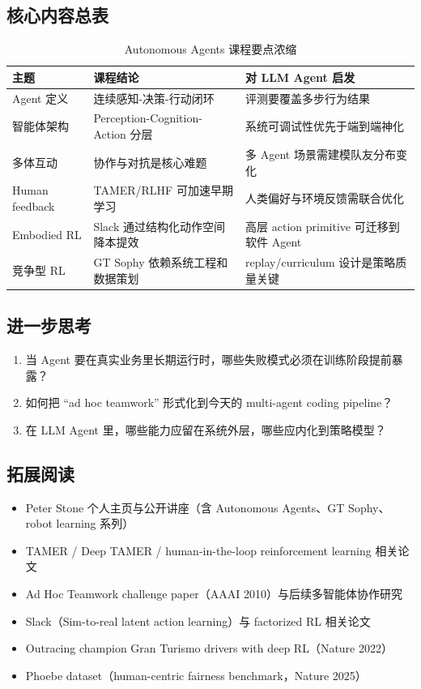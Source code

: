 \documentclass[a4paper]{article}
\begin{document}
\subsection{核心内容总表}
\begin{table}[H]
\centering
\begin{tabular}{p{2.8cm}p{4.5cm}p{4.2cm}}
\toprule
\textbf{主题} & \textbf{课程结论} & \textbf{对 LLM Agent 启发} \\
\midrule
Agent 定义 & 连续感知-决策-行动闭环 & 评测要覆盖多步行为结果 \\
智能体架构 & Perception-Cognition-Action 分层 & 系统可调试性优先于端到端神化 \\
多体互动 & 协作与对抗是核心难题 & 多 Agent 场景需建模队友分布变化 \\
Human feedback & TAMER/RLHF 可加速早期学习 & 人类偏好与环境反馈需联合优化 \\
Embodied RL & Slack 通过结构化动作空间降本提效 & 高层 action primitive 可迁移到软件 Agent \\
竞争型 RL & GT Sophy 依赖系统工程和数据策划 & replay/curriculum 设计是策略质量关键 \\
\bottomrule
\end{tabular}
\caption{Autonomous Agents 课程要点浓缩}
\end{table}

\subsection{进一步思考}
\begin{enumerate}
    \item 当 Agent 要在真实业务里长期运行时，哪些失败模式必须在训练阶段提前暴露？
    \item 如何把 ``ad hoc teamwork'' 形式化到今天的 multi-agent coding pipeline？
    \item 在 LLM Agent 里，哪些能力应留在系统外层，哪些应内化到策略模型？
\end{enumerate}

\subsection{拓展阅读}
\begin{itemize}
    \item Peter Stone 个人主页与公开讲座（含 Autonomous Agents、GT Sophy、robot learning 系列）
    \item TAMER / Deep TAMER / human-in-the-loop reinforcement learning 相关论文
    \item Ad Hoc Teamwork challenge paper（AAAI 2010）与后续多智能体协作研究
    \item Slack（Sim-to-real latent action learning）与 factorized RL 相关论文
    \item Outracing champion Gran Turismo drivers with deep RL（Nature 2022）
    \item Phoebe dataset（human-centric fairness benchmark，Nature 2025）
\end{itemize}
\end{document}
